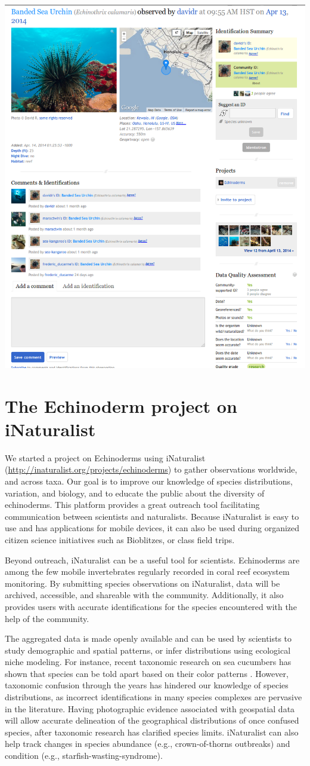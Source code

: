 \documentclass[11pt]{article}\usepackage[]{graphicx}\usepackage[]{color}
\begin{document}
\begin{center}
\includegraphics[width=.5\columnwidth]{images/inat-screenshot.png}
\label{fig:example-observation}
\end{center}

\section*{The Echinoderm project on iNaturalist}

We started a project on Echinoderms using iNaturalist
(\href{http://inaturalist.org/projects/echinoderms}{http://inaturalist.org/projects/echinoderms})
to gather observations worldwide, and across taxa. Our goal is to improve our
knowledge of species distributions, variation, and biology, and to educate the
public about the diversity of echinoderms. This platform provides a great
outreach tool facilitating communication between scientists and
naturalists. Because iNaturalist is easy to use and has applications for mobile
devices, it can also be used during organized citizen science initiatives such
as Bioblitzes, or class field trips.

Beyond outreach, iNaturalist can be a useful tool for scientists. Echinoderms
are among the few mobile invertebrates regularly recorded in coral reef
ecosystem monitoring. By submitting species observations on iNaturalist, data
will be archived, accessible, and shareable with the community. Additionally, it
also provides users with accurate identifications for the species encountered
with the help of the community.

The aggregated data is made openly available and can be used by scientists to
study demographic and spatial patterns, or infer distributions using ecological
niche modeling. For instance, recent taxonomic research on sea cucumbers has
shown that species can be told apart based on their color patterns
\citep[e.g.][]{Kim2013,Kerr2013}. However, taxonomic confusion through the
years has hindered our knowledge of species distributions, as incorrect
identifications in many species complexes are pervasive in the
literature. Having photographic evidence associated with geospatial data will
allow accurate delineation of the geographical distributions of once confused
species, after taxonomic research has clarified species limits. iNaturalist can
also help track changes in species abundance (e.g., crown-of-thorns outbreaks)
and condition (e.g., starfish-wasting-syndrome).
\end{document}
